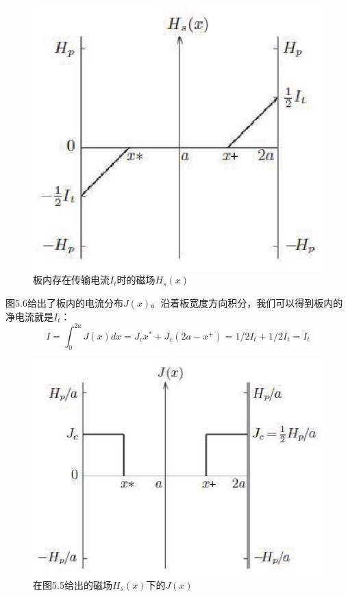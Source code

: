\begin{figure}[htbp]
  \centering
 \includegraphics[scale=0.8]{chpt5/figs/fig5.5.eps}
  \caption{板内存在传输电流$I_t$时的磁场$H_s(x)$}\label{fig:hwithi}
\end{figure}

图5.6给出了板内的电流分布$J(x)$。沿着板宽度方向积分，我们可以得到板内的净电流就是$I_t$：
\begin{equation}
  I=\int_{0}^{2a}J(x)dx=J_c x^*+J_c(2a-x^+)=1/2 I_t +1/2 I_t=I_t
\end{equation}

\begin{figure}[htbp]
  \centering
 \includegraphics[scale=0.8]{chpt5/figs/fig5.6.eps}
  \caption{在图5.5给出的磁场$H_s(x)$下的$J(x)$}\label{fig:jtoh5.5}
\end{figure}

